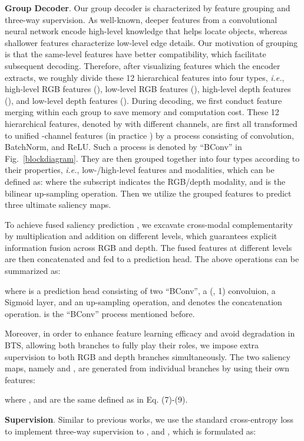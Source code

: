 \documentclass{article}
\begin{document}
\textbf{Group Decoder}. Our group decoder is characterized by feature grouping and three-way supervision. As well-known, deeper features from a convolutional neural network encode high-level knowledge that helps locate objects, whereas shallower features characterize low-level edge details. Our motivation of grouping is that the same-level features have better compatibility, which facilitate subsequent decoding. Therefore, after visualizing features which the encoder extracts, we roughly divide these 12 hierarchical features into four types, \emph{i.e.}, high-level RGB features (), low-level RGB features (), high-level depth features (), and low-level depth features (). 
During decoding, we first conduct feature merging within each group to save memory and computation cost. These 12 hierarchical features, denoted by  with different channels, are first all
transformed to unified -channel features  (in practice ) by a process consisting of convolution, BatchNorm, and ReLU. Such a process is denoted by ``BConv'' in Fig.~\ref{blockdiagram}. They are then grouped together into four types according to their properties, \emph{i.e.}, low-/high-level features and modalities, which can be defined as:
where the subscript  indicates the RGB/depth modality, and  is the bilinear up-sampling operation. Then we utilize the grouped features  to predict three ultimate saliency maps. 

To achieve fused saliency prediction , we excavate cross-modal complementarity by multiplication and addition on different levels, which guarantees explicit information fusion across RGB and depth. The fused features at different levels are then concatenated and fed to a prediction head. The above operations can be summarized as:

where  is a prediction head consisting of two ``BConv'', a (, 1) convoluion, a Sigmoid layer, and an up-sampling operation, and  denotes the concatenation operation.   is the ``BConv'' process mentioned before.





Moreover, in order to enhance feature learning efficacy and avoid degradation in BTS, allowing both branches to fully play their roles, we impose extra supervision to both RGB and depth branches simultaneously. The two saliency maps, namely  and , are generated from individual branches by using their own features:

where ,  and  are the same defined as in Eq. (7)-(9).

\textbf{Supervision}. Similar to previous works\cite{JLDCF,BBSNet,HDFNet,D3Net}, we use the standard cross-entropy loss to implement three-way supervision to ,  and , which is formulated as:
\end{document}
